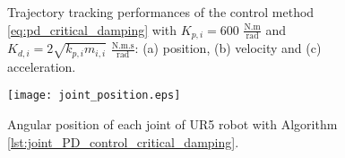 \vspace*{0cm}
\begin{figure}
	\centering
	\hfill
	\hfill
	\caption{Trajectory tracking performances of the control method \eqref{eq:pd_critical_damping} with  ${K_{p,i}}=600$ $\mathrm{\frac{N.m}{rad}}$ and $K_{d,i}= 2 \sqrt{k_{p,i} m_{i,i}} $ $\mathrm{\frac{N.m.s}{rad}}$: (a) position, (b) velocity and (c) acceleration.}
	\label{fig:act_1.3_ee_position}
\end{figure}

\begin{figure}
    \centering
    \texttt{[image: joint\_position.eps]}
    \caption{Angular position of each joint of UR5 robot with Algorithm \ref{lst:joint_PD_control_critical_damping}.}
    \label{fig:act_1.3_joint_position}
\end{figure}
